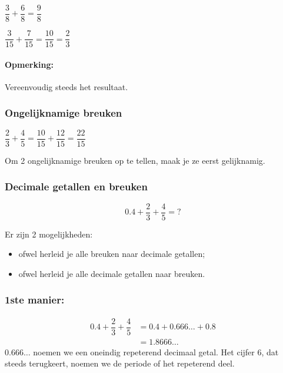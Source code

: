 \documentclass{bis}
\begin{document}
\begin{voorbeeld}
$\dfrac{3}{8} + \dfrac{6}{8} = \dfrac{9}{8}$
\end{voorbeeld}

\begin{voorbeeld}
$\dfrac{3}{15} + \dfrac{7}{15} = \dfrac{10}{15} = \dfrac{2}{3}$
\end{voorbeeld}

\paragraph*{Opmerking:}
Vereenvoudig steeds het resultaat.

\subsubsection{Ongelijknamige breuken}
$\dfrac{2}{3}+\dfrac{4}{5}=\dfrac{10}{15}+\dfrac{12}{15}=\dfrac{22}{15}$

\begin{onthoud}
Om 2 ongelijknamige breuken op te tellen, maak je ze eerst gelijknamig.
\end{onthoud}

\subsubsection{Decimale getallen en breuken}

\[0.4 + \dfrac{2}{3}+\dfrac{4}{5}= ?\]

Er zijn 2 mogelijkheden:
\begin{itemize}
  \item ofwel herleid je alle breuken naar decimale getallen;
  \item ofwel herleid je alle decimale getallen naar breuken.
\end{itemize}

\subsubsection*{1ste manier:}

\begin{voorbeeld}
\begin{align*}
  0.4 + \dfrac{2}{3} + \dfrac{4}{5} &= 0.4 + 0.666\ldots + 0.8\\
                                    &= 1.8666\ldots
\end{align*}
$0.666\ldots$ noemen we een oneindig repeterend decimaal getal. Het cijfer $6$, dat steeds terugkeert, noemen we de periode of het repeterend deel.
\end{voorbeeld}
\end{document}
